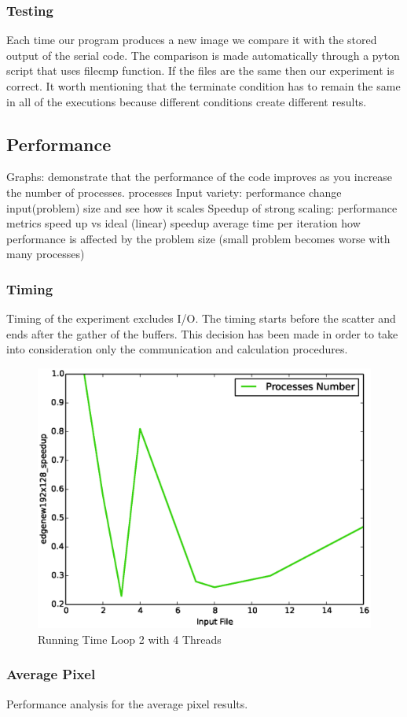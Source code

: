 \documentclass[12pt,a4paper]{article}
\newcommand{\sectionVspacing}{\vspace{15pt}}
\begin{document}
		\subsubsection{Testing}
			Each time our program produces a new image we compare it with the stored output of the serial code. The comparison is made automatically through a pyton script that uses filecmp function. If the files are the same then our experiment is correct. It worth mentioning that the terminate condition has to remain the same in all of the executions because different conditions create different results.


	\subsection{Performance}
		Graphs: demonstrate that the performance of the code improves as you increase the number of processes.
			processes
			Input variety: performance change input(problem) size and see how it scales
			Speedup of strong scaling: performance metrics speed up vs ideal (linear) speedup
			average time per iteration
			how performance is affected by the problem size (small problem becomes worse with many processes)

		\subsubsection{Timing}
			Timing of the experiment excludes I/O. The timing starts before the scatter and ends after the gather of the buffers. This decision has been made in order to take into consideration only the communication and calculation procedures.
			
			\begin{figure}[ht]
				\centering
				\includegraphics[scale=0.6]{../graphs/edgenew192x128_speedup.eps}
				\caption{Running Time Loop 2 with 4 Threads}
				\label{loop2-threads4}
			\end{figure}

		\subsubsection{Average Pixel}
			Performance analysis for the average pixel results.

\sectionVspacing


\end{document}
